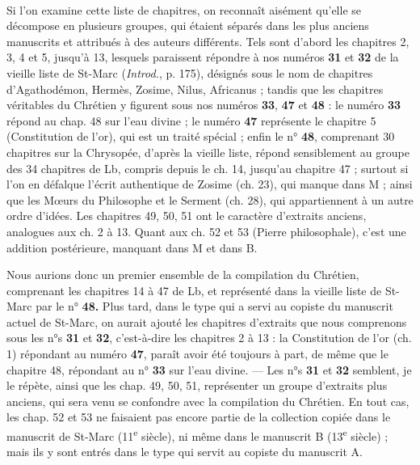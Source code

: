 \documentclass[a4paper, 11pt, oneside, polutonikogreek, french]{article}
\begin{document}
\paragraph{}
Si l'on examine cette liste de chapitres, on reconnaît aisément qu'elle se décompose en plusieurs groupes, qui étaient séparés dans les plus anciens manuscrits et attribués à des auteurs différents. Tels sont d'abord les chapitres 2, 3, 4 et 5, jusqu'à 13, lesquels paraissent répondre à nos numéros \textbf{31} et \textbf{32} de la vieille liste de St-Marc (\emph{Introd.}, p. 175), désignés sous le nom de chapitres d'Agathodémon, Hermès, Zosime, Nilus, Africanus ; tandis que les chapitres véritables du Chrétien y figurent sous nos numéros \textbf{33}, \textbf{47} et \textbf{48} : le numéro \textbf{33} répond au chap. 48 sur l'eau divine ; le numéro \textbf{47} représente le chapitre 5 (Constitution de l'or), qui est un traité spécial ; enfin le n° \textbf{48}, comprenant 30 chapitres sur la Chrysopée, d'après la vieille liste, répond sensiblement au groupe des 34 chapitres de Lb, compris depuis le ch. 14, jusqu'au chapitre 47 ; surtout si l'on en défalque l'écrit authentique de Zosime (ch. 23), qui manque dans M ; ainsi que les Mœurs du Philosophe et le Serment (ch. 28), qui appartiennent à un autre ordre d'idées. Les chapitres 49, 50, 51 ont le caractère d'extraits anciens, analogues aux ch. 2 à 13. Quant aux ch. 52 et 53 (Pierre philosophale), c'est une addition postérieure, manquant dans M et dans B.

Nous aurions donc un premier ensemble de la compilation du Chrétien, comprenant les chapitres 14 à 47 de Lb, et représenté dans la vieille liste de St-Marc par le n° \textbf{48.} Plus tard, dans le type qui a servi au copiste du manuscrit actuel de St-Marc, on aurait ajouté les chapitres d'extraits que nous comprenons sous les n°s \textbf{31} et \textbf{32}, c'est-à-dire les chapitres 2 à 13 : la Constitution de l'or (ch. 1) répondant au numéro \textbf{47}, paraît avoir été toujours à part, de même que le chapitre 48, répondant au n° \textbf{33} sur l'eau divine. --- Les n°s \textbf{31} et \textbf{32} semblent, je le répète, ainsi que les chap. 49, 50, 51, représenter un groupe d'extraits plus anciens, qui sera venu se confondre avec la compilation du Chrétien. En tout cas, les chap. 52 et 53 ne faisaient pas encore partie de la collection copiée dans le manuscrit de St-Marc (11\textsuperscript{e} siècle), ni même dans le manuscrit B (13\textsuperscript{e} siècle) ; mais ils y sont entrés dans le type qui servit au copiste du manuscrit A.
\end{document}
